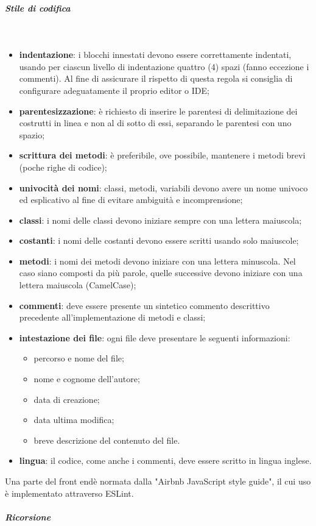 			\subparagraph*{Stile di codifica} \mbox{}\\
			
				\begin{itemize}
					\item \textbf{indentazione}: i blocchi innestati devono essere correttamente 
						indentati, usando per ciascun livello di indentazione quattro (4) spazi (fanno 
						eccezione i commenti). Al fine di assicurare il rispetto di questa regola si 
						consiglia di configurare adeguatamente il proprio editor o IDE;
					\item \textbf{parentesizzazione}: è richiesto di inserire le parentesi di delimitazione dei costrutti in linea e non al di sotto di essi, separando le parentesi con uno spazio;
					\item \textbf{scrittura dei metodi}: è preferibile, ove possibile, 
						mantenere i metodi brevi (poche righe di codice);
					\item \textbf{univocità dei nomi}: classi, metodi, variabili devono avere un 
						nome univoco	ed esplicativo al fine di evitare ambiguità e incomprensione;
					\item \textbf{classi}: i nomi delle classi devono iniziare sempre con una 
						lettera maiuscola;		
					\item \textbf{costanti}: i nomi delle costanti devono essere scritti usando 
						solo maiuscole;
					\item \textbf{metodi}: i nomi dei metodi devono iniziare con una lettera 
						minuscola. Nel caso siano composti da più parole, quelle successive devono iniziare con una 
						lettera maiuscola (CamelCase\glo{});
					\item \textbf{commenti}: deve essere presente un sintetico commento descrittivo precedente all'implementazione di metodi e classi;
					\item \textbf{intestazione dei file}: ogni file deve presentare le seguenti informazioni:
						\begin{itemize}
							\item percorso e nome del file;
							\item nome e cognome dell'autore;
							\item data di creazione;
							\item data ultima modifica;
							\item breve descrizione del contenuto del file.
						\end{itemize}
					\item \textbf{lingua}: il codice, come anche i commenti, deve essere scritto 
						in lingua inglese.
				\end{itemize}
			Una parte del front end\glosp è normata dalla "Airbnb JavaScript style 
			guide", il cui uso è implementato attraverso ESLint\glo. \newline \newline
			\subparagraph*{Ricorsione}  \mbox{}\\
			
